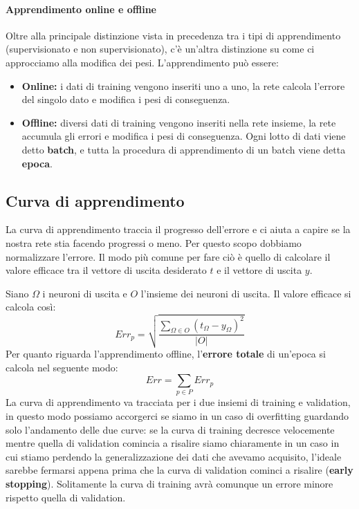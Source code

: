 \documentclass[12pt, twoside, letterpaper]{report}
\begin{document}
			\paragraph{Apprendimento online e offline} Oltre alla principale distinzione vista in precedenza tra i tipi di apprendimento (supervisionato e non supervisionato), c'è un'altra distinzione su come ci approcciamo alla modifica dei pesi. L'apprendimento può essere: 
				\begin{itemize}
					\item \textbf{Online:} i dati di training vengono inseriti uno a uno, la rete calcola l'errore del singolo dato e modifica i pesi di conseguenza.
					\item \textbf{Offline:} diversi dati di training vengono inseriti nella rete insieme, la rete accumula gli errori e modifica i pesi di conseguenza. Ogni lotto di dati viene detto \textbf{batch}, e tutta la procedura di apprendimento di un batch viene detta \textbf{epoca}.
				\end{itemize}
				
			\subsection{Curva di apprendimento}
				La curva di apprendimento traccia il progresso dell'errore e ci aiuta a capire se la nostra rete stia facendo progressi o meno. Per questo scopo dobbiamo normalizzare l'errore. Il modo più comune per fare ciò è quello di calcolare il valore efficace tra il vettore di uscita desiderato $t$ e il vettore di uscita $y$.  

				Siano $\Omega$ i neuroni di uscita e $O$ l'insieme dei neuroni di uscita. Il valore efficace si calcola così: $$Err_p = \sqrt{\frac{\sum_{\Omega \in O} (t_{\Omega} - y_{\Omega})^2}{|O|}}$$
				Per quanto riguarda l'apprendimento offline, l'\textbf{errore totale} di un'epoca si calcola nel seguente modo: $$Err = \sum_{p \in P} Err_p$$
				La curva di apprendimento va tracciata per i due insiemi di training e validation, in questo modo possiamo accorgerci se siamo in un caso di overfitting guardando solo l'andamento delle due curve: se la curva di training decresce velocemente mentre quella di validation comincia a risalire siamo chiaramente in un caso in cui stiamo perdendo la generalizzazione dei dati che avevamo acquisito, l'ideale sarebbe fermarsi appena prima che la curva di validation cominci a risalire (\textbf{early stopping}). Solitamente la curva di training avrà comunque un errore minore rispetto quella di validation.
\end{document}
